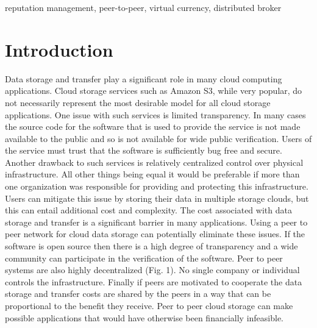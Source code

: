 \documentclass[%
				10pt,
        final,
        notitlepage,
        narroweqnarray,
        inline,
        twoside,
        ]{ieee}
\begin{document}
\begin{keywords}
reputation management, peer-to-peer, virtual currency, distributed broker
\end{keywords}

\section{Introduction}

\PARstart Data storage and transfer play a significant role in many cloud computing applications.  Cloud storage services such as Amazon S3, while very popular, do not necessarily represent the most desirable model for all cloud storage applications.  One issue with such services is limited transparency.  In many cases the source code for the software that is used to provide the service is not made available to the public and so is not available for wide public verification.  Users of the service must trust that the software is sufficiently bug free and secure.  Another drawback to such services is relatively centralized control over physical infrastructure.  All other things being equal it would be preferable if more than one organization was responsible for providing and protecting this infrastructure.  Users can mitigate this issue by storing their data in multiple storage clouds, but this can entail additional cost and complexity.  The cost associated with data storage and transfer is a significant barrier in many applications.  Using a peer to peer network for cloud data storage can potentially eliminate these issues.  If the software is open source then there is a high degree of transparency and a wide community can participate in the verification of the software.  Peer to peer systems are also highly decentralized (Fig. 1).  No single company or individual controls the infrastructure.  Finally if peers are motivated to cooperate the data storage and transfer costs are shared by the peers in a way that can be proportional to the benefit they receive.  Peer to peer cloud storage can make possible applications that would have otherwise been financially infeasible. 
\end{document}

